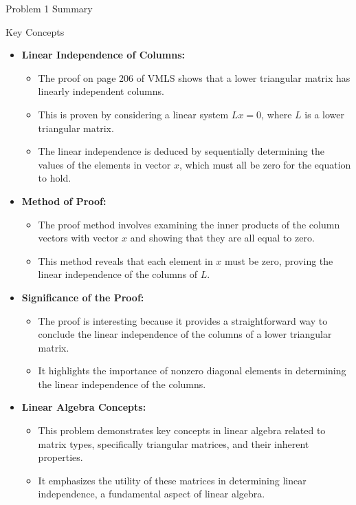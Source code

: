 \begin{summary}{Problem 1 Summary}
\begin{statement}{Key Concepts}
\begin{itemize}
            \item \textbf{Linear Independence of Columns:}
            \begin{itemize}
                \item The proof on page 206 of VMLS shows that a lower triangular matrix has linearly independent columns.
                \item This is proven by considering a linear system $Lx = 0$, where $L$ is a lower triangular matrix.
                \item The linear independence is deduced by sequentially determining the values of the elements in vector $x$, which must all be zero for the equation to hold.
            \end{itemize}
            \item \textbf{Method of Proof:}
            \begin{itemize}
                \item The proof method involves examining the inner products of the column vectors with vector $x$ and showing that they are all equal to zero.
                \item This method reveals that each element in $x$ must be zero, proving the linear independence of the columns of $L$.
            \end{itemize}
            \item \textbf{Significance of the Proof:}
            \begin{itemize}
                \item The proof is interesting because it provides a straightforward way to conclude the linear independence of the columns of a lower triangular matrix.
                \item It highlights the importance of nonzero diagonal elements in determining the linear independence of the columns.
            \end{itemize}
            \item \textbf{Linear Algebra Concepts:}
            \begin{itemize}
                \item This problem demonstrates key concepts in linear algebra related to matrix types, specifically triangular matrices, and their inherent properties.
                \item It emphasizes the utility of these matrices in determining linear independence, a fundamental aspect of linear algebra.
            \end{itemize}
        \end{itemize}

\end{statement}
\end{summary}
